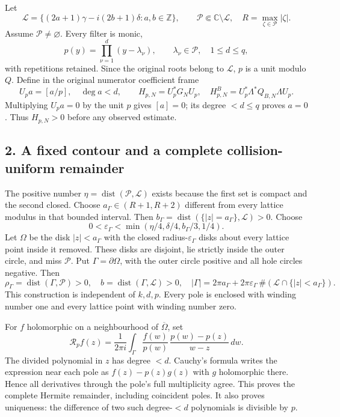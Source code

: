 \documentclass[11pt]{article}
\begin{document}
Let \[
\mathscr L=\{(2a+1)\gamma-i(2b+1)\delta:a,b\in\mathbb Z\},\qquad
\mathscr P\Subset\mathbb C\setminus\mathscr L,\quad
R=\max_{\zeta\in\mathscr P}|\zeta|.
\] Assume \(\mathscr P\ne\varnothing\). Every filter is monic, \[
p(y)=\prod_{\nu=1}^{d}(y-\lambda_\nu),\qquad
\lambda_\nu\in\mathscr P,\quad1\le d\le q,
\] with repetitions retained. Since the original roots belong to \(\mathscr L\), \(p\) is a unit modulo \(Q\). Define in the original numerator coefficient frame \[
U_pa=[a/p],\quad \deg a<d,\qquad
H_{p,N}=U_p^*G_NU_p,\quad
H^B_{p,N}=U_p^*\Lambda^*Q_{B,N}\Lambda U_p.
\tag{RF5}
\] Multiplying \(U_pa=0\) by the unit \(p\) gives \([a]=0\); its degree \(<d\le q\) proves \(a=0\). Thus \(H_{p,N}>0\) before any observed estimate.

\subsection{2. A fixed contour and a complete collision-uniform remainder}\label{a-fixed-contour-and-a-complete-collision-uniform-remainder}

The positive number \(\eta=\operatorname{dist}(\mathscr P,\mathscr L)\) exists because the first set is compact and the second closed. Choose \(a_\Gamma\in(R+1,R+2)\) different from every lattice modulus in that bounded interval. Then \(b_\Gamma=\operatorname{dist}(\{|z|=a_\Gamma\},\mathscr L)>0\). Choose \[
0<\varepsilon_\Gamma<\min(\eta/4,\delta/4,b_\Gamma/3,1/4).
\] Let \(\Omega\) be the disk \(|z|<a_\Gamma\) with the closed radius-\(\varepsilon_\Gamma\) disks about every lattice point inside it removed. These disks are disjoint, lie strictly inside the outer circle, and miss \(\mathscr P\). Put \(\Gamma=\partial\Omega\), with the outer circle positive and all hole circles negative. Then \[
\rho_\Gamma=\operatorname{dist}(\Gamma,\mathscr P)>0,\quad
b=\operatorname{dist}(\Gamma,\mathscr L)>0,\quad
|\Gamma|=2\pi a_\Gamma+2\pi\varepsilon_\Gamma\,\#(\mathscr L\cap\{|z|<a_\Gamma\}).
\tag{RF6}
\] This construction is independent of \(k,d,p\). Every pole is enclosed with winding number one and every lattice point with winding number zero.

For \(f\) holomorphic on a neighbourhood of \(\overline\Omega\), set \[
\mathcal R_pf(z)=\frac1{2\pi i}\int_\Gamma
\frac{f(w)}{p(w)}\,\frac{p(w)-p(z)}{w-z}\,dw .
\tag{RF7}
\] The divided polynomial in \(z\) has degree \(<d\). Cauchy's formula writes the expression near each pole as \(f(z)-p(z)g(z)\) with \(g\) holomorphic there. Hence all derivatives through the pole's full multiplicity agree. This proves the complete Hermite remainder, including coincident poles. It also proves uniqueness: the difference of two such degree-\(<d\) polynomials is divisible by \(p\).
\end{document}

